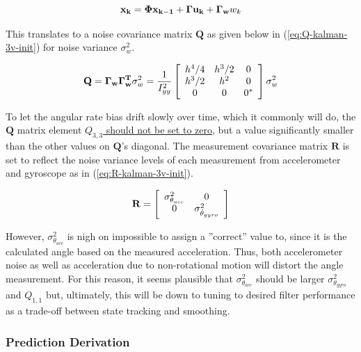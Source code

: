 \documentclass[a4paper]{report}
\begin{document}
\begin{equation}
\mathbf{x_{k}} = \mathbf{\Phi x_{k-1}} + \mathbf{\Gamma u_{k}} + \mathbf{\Gamma_w}w_k \\
\label{eq:disc-sys-kalman-3s-noise}
\end{equation}

This translates to a noise covariance matrix $\mathbf{Q}$ as given below in (\ref{eq:Q-kalman-3v-init}) for noise variance $\sigma^2_w$.

\begin{equation}
\label{eq:Q-kalman-3v-init}
\mathbf{Q} = \mathbf{\Gamma_w \Gamma_w^T} \sigma^2_w = \dfrac{1}{I_{yy}^2}
\left[
\begin{array}{c c c}
h^4/4 & h^3/2 & 0 \\
h^3/2 & h^2 & 0 \\
0 & 0 & 0^{*}
\end{array}\right] \sigma^2_w
\end{equation}

To let the angular rate bias drift slowly over time, which it commonly will do, the $\mathbf{Q}$ matrix element \underline{$Q_{3,3}$ should not be set to zero}, but a value significantly smaller than the other values on $\mathbf{Q}$'s diagonal. The measurement covariance matrix $\mathbf{R}$ is set to reflect the noise variance levels of each measurement from accelerometer and gyroscope as in (\ref{eq:R-kalman-3v-init}). 

\begin{equation}
\label{eq:R-kalman-3v-init}
\mathbf{R} =
\left[
\begin{array}{c c c}
\sigma^2 _{\theta_{acc}} & 0 \\
0 & \sigma^2 _{\dot{\theta}_{gyro}} 
\end{array}\right]
\end{equation}

However, $\sigma^2 _{\theta_{acc}}$ is nigh on impossible to assign a ''correct'' value to, since it is the calculated angle based on the measured acceleration. Thus, both accelerometer noise as well as acceleration due to non-rotational motion will distort the angle measurement. For this reason, it seems plausible that $\sigma^2 _{\theta_{acc}}$ should be larger $\sigma^2 _{\theta_{gyro}}$ and $Q_{1,1}$ but, ultimately, this will be down to tuning to desired filter performance as a trade-off between state tracking and smoothing.

		\subsubsection{Prediction Derivation}
\end{document}
